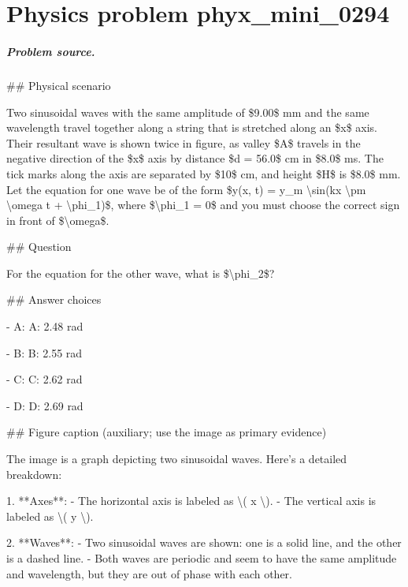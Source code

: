 
\chapter{Physics problem phyx\_mini\_0294}
\label{ch:PhyXMiniProblems_problem_phyx_mini_0294}

\paragraph{Problem source.}
\#\# Physical scenario

Two sinusoidal waves with the same amplitude of \$9.00\$ mm and the same wavelength travel together along a string that is stretched along an \$x\$ axis. Their resultant wave is shown twice in figure, as valley \$A\$ travels in the negative direction of the \$x\$ axis by distance \$d = 56.0\$ cm in \$8.0\$ ms. The tick marks along the axis are separated by \$10\$ cm, and height \$H\$ is \$8.0\$ mm. Let the equation for one wave be of the form \$y(x, t) = y\_m \textbackslash{}sin(kx \textbackslash{}pm \textbackslash{}omega t + \textbackslash{}phi\_1)\$, where \$\textbackslash{}phi\_1 = 0\$ and you must choose the correct sign in front of \$\textbackslash{}omega\$.

\#\# Question

For the equation for the other wave, what is \$\textbackslash{}phi\_2\$?

\#\# Answer choices

- A: A: 2.48 rad

- B: B: 2.55 rad

- C: C: 2.62 rad

- D: D: 2.69 rad

\#\# Figure caption (auxiliary; use the image as primary evidence)

The image is a graph depicting two sinusoidal waves. Here’s a detailed breakdown:

1. **Axes**: 
   - The horizontal axis is labeled as \textbackslash{}( x \textbackslash{}).
   - The vertical axis is labeled as \textbackslash{}( y \textbackslash{}).

2. **Waves**:
   - Two sinusoidal waves are shown: one is a solid line, and the other is a dashed line.
   - Both waves are periodic and seem to have the same amplitude and wavelength, but they are out of phase with each other.


